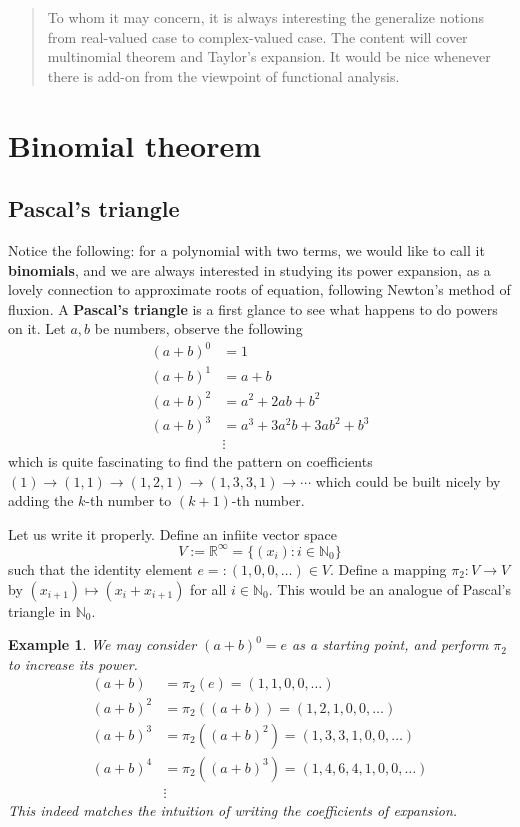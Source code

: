 \documentclass[12pt]{article}
\newtheorem*{example}{Example}
\begin{document}
    \begin{abstract}
        To whom it may concern, it is always interesting the generalize notions from real-valued case to complex-valued case. The content will cover multinomial theorem and Taylor's expansion. It would be nice whenever there is add-on from the viewpoint of functional analysis.
    \end{abstract}

    \section{Binomial theorem}

    \subsection{Pascal's triangle}

    Notice the following: for a polynomial with two terms, we would like to call it \textbf{binomials}, and we are always interested in studying its power expansion, as a lovely connection to approximate roots of equation, following Newton's method of fluxion. A \textbf{Pascal's triangle} is a first glance to see what happens to do powers on it. Let $a,b$ be numbers, observe the following\begin{align*}
        (a+b)^0&=1\\
        (a+b)^1&=a+b\\
        (a+b)^2&=a^2+2ab+b^2\\
        (a+b)^3&=a^3+3a^2b+3ab^2+b^3\\
        &\vdots
    \end{align*}
    which is quite fascinating to find the pattern on coefficients $(1)\to(1,1)\to(1,2,1)\to(1,3,3,1)\to\cdots$ which could be built nicely by adding the $k$-th number to $(k+1)$-th number.

    Let us write it properly. Define an infiite vector space \[V:=\mathbb{R}^{\infty}=\{(x_i):i\in\mathbb{N}_0\}\] such that the identity element $e=:(1,0,0,\dots)\in V$. Define a mapping $\pi_2:V\to V$ by $(x_{i+1})\mapsto (x_i+x_{i+1})$ for all $i\in\mathbb{N}_0$. This would be an analogue of Pascal's triangle in $\mathbb{N}_0$.

    \begin{example}
        We may consider $(a+b)^0=e$ as a starting point, and perform $\pi_2$ to increase its power.\begin{align*}
            (a+b)&=\pi_2(e)=(1,1,0,0,\dots)\\
            (a+b)^2&=\pi_2((a+b))=(1,2,1,0,0,\dots)\\
            (a+b)^3&=\pi_2((a+b)^2)=(1,3,3,1,0,0,\dots)\\
            (a+b)^4&=\pi_2((a+b)^3)=(1,4,6,4,1,0,0,\dots)\\
            &\vdots
        \end{align*}
        This indeed matches the intuition of writing the coefficients of expansion.
    \end{example}
\end{document}
